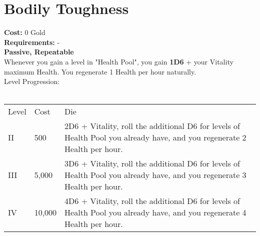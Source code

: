 \section{Bodily Toughness}\label{sec:bodilythoughness}
\textbf{Cost:} 0 Gold\\
\textbf{Requirements:} -\\
\textbf{Passive, Repeatable}\\
Whenever you gain a level in "Health Pool", you gain \textbf{1D6} + your Vitality maximum Health.
You regenerate 1 Health per hour naturally.
\\
Level Progression:\\
\\
\begin{tabular}{l | l | p{12cm} }
    Level & Cost & Die\\
    II & 500 & 2D6 + Vitality, roll the additional D6 for levels of Health Pool you already have, and you regenerate 2 Health per hour. \\
    III & 5,000 & 3D6 + Vitality, roll the additional D6 for levels of Health Pool you already have, and you regenerate 3 Health per hour. \\
    IV & 10,000 & 4D6 + Vitality, roll the additional D6 for levels of Health Pool you already have, and you regenerate 4 Health per hour.\\
\end{tabular}